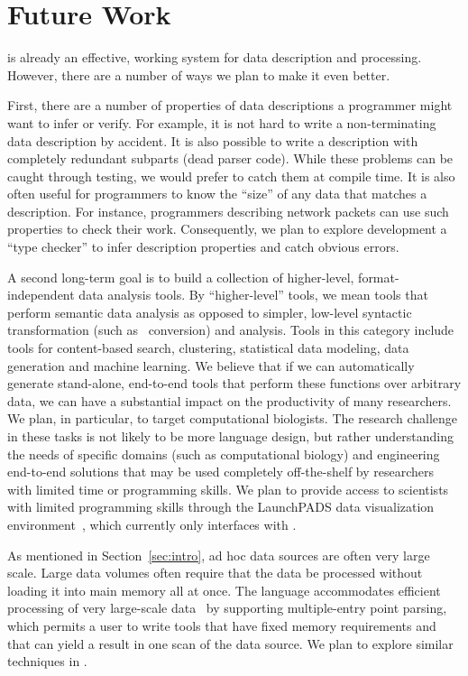 \section{Future Work}
\label{sec:future}

\padsml{} is already an effective, working system for data description
and processing.  However, there are a number of ways we plan to make it 
even better.

First, there are a number of properties of data descriptions
a programmer might want to infer or verify.  For example, it is not hard to
write a non-terminating data description by accident.  It
is also possible to write a description with completely redundant
subparts (dead parser code).  While these problems can be caught 
through testing,
we would prefer to catch them at compile time.  It is also often useful
for programmers to know the ``size'' of any data that matches 
a description.  For instance, programmers describing network packets can use
such properties to check
their work. Consequently,
we plan to explore development a \padsml{} ``type checker'' 
to infer description properties and catch obvious errors.

A second long-term goal is to build a collection of
higher-level, format-independent data analysis tools.  By
``higher-level'' tools, we mean tools that perform semantic data
analysis as opposed to simpler, low-level syntactic transformation
(such as \xml\ conversion) and analysis.  
Tools in this category include tools for
content-based search, clustering, statistical data modeling, data 
generation and machine learning.  We believe that if we can automatically
generate stand-alone,
end-to-end tools that perform these functions over arbitrary data, 
we can have a substantial impact on the
productivity of many researchers.  We plan, in particular,  
to target computational biologists.  The research challenge
in these tasks is not likely to be more language design, but rather
understanding the needs of specific domains 
(such as computational biology) and engineering end-to-end solutions
that may be used completely off-the-shelf
by researchers with limited time or programming skills.  We plan
to provide access to scientists with limited programming skills
through the LaunchPADS data visualization 
environment~\cite{launchpads:planx,launchpads:sigmod}, which currently
only interfaces with \padsc{}.

As mentioned in Section~\ref{sec:intro}, ad hoc data sources are often
very large scale.  Large data volumes often require that the data be
processed without loading it into main memory all at once.  The
\padsc{} language accommodates efficient processing of very
large-scale data~\cite{fisher+:pldi05} by supporting multiple-entry
point parsing, which permits a user to write tools that have fixed
memory requirements and that can yield a result in one scan of the
data source.  We plan to explore similar techniques in \padsml{}. 

